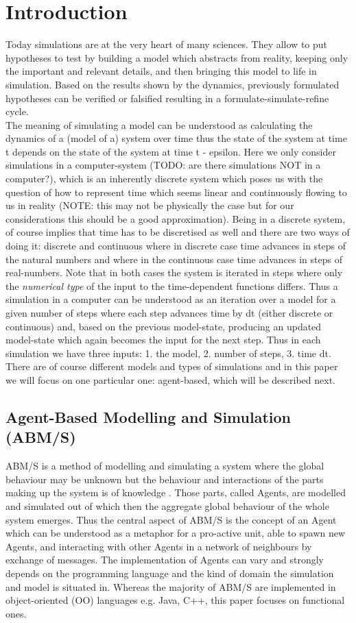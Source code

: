 \section{Introduction}
Today simulations are at the very heart of many sciences. They allow to put hypotheses to test by building a model which abstracts from reality, keeping only the important and relevant details, and then bringing this model to life in simulation. Based on the results shown by the dynamics, previously formulated hypotheses can be verified or falsified resulting in a formulate-simulate-refine cycle. \\
The meaning of simulating a model can be understood as calculating the dynamics of a (model of a) system over time thus the state of the system at time t depends on the state of the system at time t - epsilon. Here we only consider simulations in a computer-system (TODO: are there simulations NOT in a computer?), which is an inherently discrete system which poses us with the question of how to represent time which seems linear and continuously flowing to us in reality (NOTE: this may not be physically the case but for our considerations this should be a good approximation). Being in a discrete system, of course implies that time has to be discretised as well and there are two ways of doing it: discrete and continuous where in discrete case time advances in steps of the natural numbers and where in the continuous case time advances in steps of real-numbers. Note that in both cases the system is iterated in steps where only the \textit{numerical type} of the input to the time-dependent functions differs. Thus a simulation in a computer can be understood as an iteration over a model for a given number of steps where each step advances time by dt (either discrete or continuous) and, based on the previous model-state, producing an updated model-state which again becomes the input for the next step. Thus in each simulation we have three inputs: 1. the model, 2. number of steps, 3. time dt. There are of course different models and types of simulations and in this paper we will focus on one particular one: agent-based, which will be described next.

\subsection{Agent-Based Modelling and Simulation (ABM/S)}
ABM/S is a method of modelling and simulating a system where the global behaviour may be unknown but the behaviour and interactions of the parts making up the system is of knowledge \cite{wooldridge_introduction_2009}. Those parts, called Agents, are modelled and simulated out of which then the aggregate global behaviour of the whole system emerges. Thus the central aspect of ABM/S is the concept of an Agent which can be understood as a metaphor for a pro-active unit, able to spawn new Agents, and interacting with other Agents in a network of neighbours by exchange of messages. The implementation of Agents can vary and strongly depends on the programming language and the kind of domain the simulation and model is situated in. Whereas the majority of ABM/S are implemented in object-oriented (OO) languages e.g. Java, C++, this paper focuses on functional ones.

